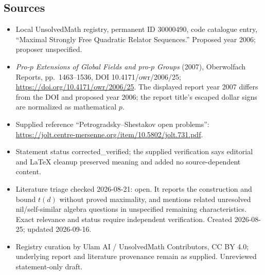 \documentclass[11pt]{article}
\begin{document}
\subsection{Sources}
\begin{itemize}
\item Local UnsolvedMath registry, permanent ID 30000490, code catalogue entry, ``Maximal Strongly Free Quadratic Relator Sequences.'' Proposed year 2006; proposer unspecified.
\item \emph{Pro-$p$ Extensions of Global Fields and pro-$p$ Groups} (2007), Oberwolfach Reports, pp.\ 1463--1536, DOI 10.4171/owr/2006/25; \url{https://doi.org/10.4171/owr/2006/25}. The displayed report year 2007 differs from the DOI and proposed year 2006; the report title's escaped dollar signs are normalized as mathematical $p$.
\item Supplied reference ``Petrogradsky--Shestakov open problems'': \url{https://jolt.centre-mersenne.org/item/10.5802/jolt.731.pdf}.
\item Statement status corrected\_verified; the supplied verification says editorial and LaTeX cleanup preserved meaning and added no source-dependent content.
\item Literature triage checked 2026-08-21: open. It reports the construction and bound $t(d)$ without proved maximality, and mentions related unresolved nil/self-similar algebra questions in unspecified remaining characteristics. Exact relevance and status require independent verification. Created 2026-08-25; updated 2026-09-16.
\item Registry curation by Ulam AI / UnsolvedMath Contributors, CC BY 4.0; underlying report and literature provenance remain as supplied. Unreviewed statement-only draft.
\end{itemize}
\end{document}

